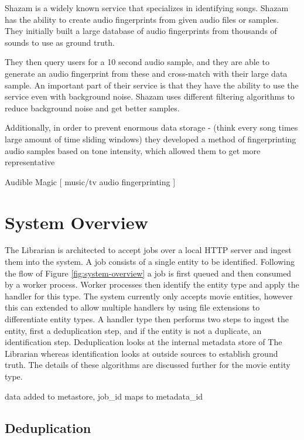 \documentclass[paper=a4, fontsize=11pt]{scrartcl} %
\numberwithin{equation}{section} %
\numberwithin{figure}{section} %
\numberwithin{table}{section} %
\begin{document}
Shazam is a widely known service that specializes in identifying songs. Shazam has the ability to create audio fingerprints from given audio files or samples. They initially built a large database of audio fingerprints from thousands of sounds to use as ground truth. 

They then query users for a 10 second audio sample, and they are able to generate an audio fingerprint from these and cross-match with their large data sample. An important part of their service is that they have the ability to use the service even with background noise. Shazam uses different filtering algorithms to reduce background noise and get better samples. 

Additionally, in order to prevent enormous data storage - (think every song times large amount of time sliding windows) they developed a method of fingerprinting audio samples based on tone intensity, which allowed them to get more representative 

Audible Magic [ music/tv audio fingerprinting ]




\section{System Overview}
\label{sec:system-overview}
The Librarian is architected to accept jobs over a local HTTP server and ingest them into the system. A job consists of a single entity to be identified. Following the flow of Figure \ref{fig:system-overview} a job is first queued and then consumed by a worker process. Worker processes then identify the entity type and apply the handler for this type. The system currently only accepts movie entities, however this can extended to allow multiple handlers by using file extensions to differentiate entity types. A handler type then performs two steps to ingest the entity, first a deduplication step, and if the entity is not a duplicate, an identification step. Deduplication looks at the internal metadata store of The Librarian whereas identification looks at outside sources to establish ground truth. The details of these algorithms are discussed further for the movie entity type.

data added to metastore, job_id maps to metadata_id


\subsection{Deduplication}
\label{sec:deduplication}
\end{document}
